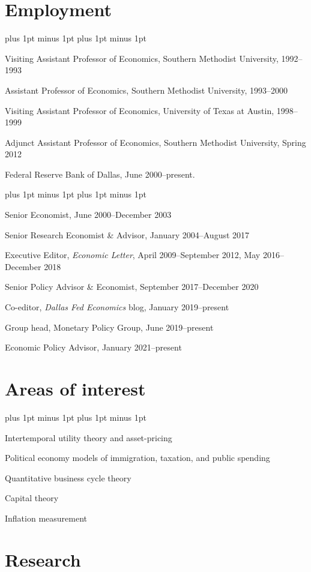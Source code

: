 \documentclass[letterpaper]{article}
\renewenvironment{itemize}{
  \begin{list}{}{
    \setlength{\leftmargin}{1.5em}
    \itemsep -1pt plus 1pt minus 1pt
    \topsep -1pt plus 1pt minus 1pt
  }
}{
  \end{list}
}
\begin{document}
\section*{Employment}
\begin{itemize}
\item Visiting Assistant Professor of Economics, Southern Methodist University, 1992--1993
\item Assistant Professor of Economics, Southern Methodist University, 1993--2000
\item Visiting Assistant Professor of Economics, University of Texas at Austin, 1998--1999
\item Adjunct Assistant Professor of Economics, Southern Methodist University, Spring 2012
\item Federal Reserve Bank of Dallas, June 2000--present.
	\begin{itemize}
	\item Senior Economist, June 2000--December 2003
	\item Senior Research Economist \& Advisor, January 2004--August 2017
	\item Executive Editor, \emph{Economic Letter}, April 2009--September 2012, May 2016--December 2018
	\item Senior Policy Advisor \& Economist, September 2017--December 2020
	\item Co-editor, \emph{Dallas Fed Economics} blog, January 2019--present
	\item Group head, Monetary Policy Group, June 2019--present
	\item Economic Policy Advisor, January 2021--present
	\end{itemize}
\end{itemize}

\section*{Areas of interest}
\begin{itemize}
\item Intertemporal utility theory and asset-pricing
\item Political economy models of immigration, taxation, and public spending
\item Quantitative business cycle theory
\item Capital theory
\item Inflation measurement
\end{itemize}

\section*{Research}
\end{document}
